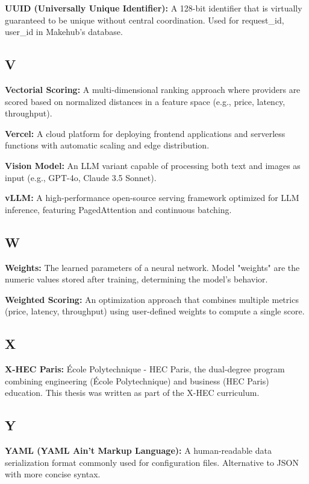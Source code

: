 \documentclass[english]{article}
\begin{document}
\textbf{UUID (Universally Unique Identifier):} A 128-bit identifier that is virtually guaranteed to be unique without central coordination. Used for request\_id, user\_id in Makehub's database.

\subsection*{V}

\textbf{Vectorial Scoring:} A multi-dimensional ranking approach where providers are scored based on normalized distances in a feature space (e.g., price, latency, throughput).

\textbf{Vercel:} A cloud platform for deploying frontend applications and serverless functions with automatic scaling and edge distribution.

\textbf{Vision Model:} An LLM variant capable of processing both text and images as input (e.g., GPT-4o, Claude 3.5 Sonnet).

\textbf{vLLM:} A high-performance open-source serving framework optimized for LLM inference, featuring PagedAttention and continuous batching.

\subsection*{W}

\textbf{Weights:} The learned parameters of a neural network. Model "weights" are the numeric values stored after training, determining the model's behavior.

\textbf{Weighted Scoring:} An optimization approach that combines multiple metrics (price, latency, throughput) using user-defined weights to compute a single score.

\subsection*{X}

\textbf{X-HEC Paris:} École Polytechnique - HEC Paris, the dual-degree program combining engineering (École Polytechnique) and business (HEC Paris) education. This thesis was written as part of the X-HEC curriculum.

\subsection*{Y}

\textbf{YAML (YAML Ain't Markup Language):} A human-readable data serialization format commonly used for configuration files. Alternative to JSON with more concise syntax.
\end{document}
